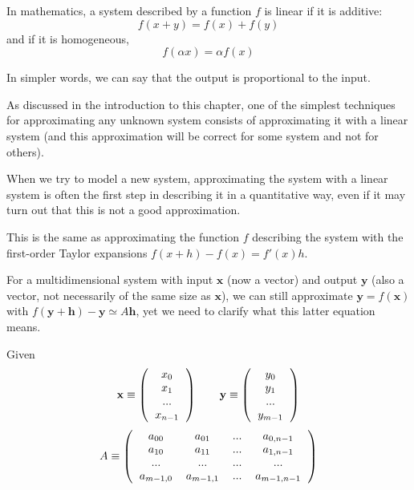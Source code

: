 \documentclass[justified, sixbynine]{tufte-book}
\theoremstyle{plain}%
\newtheorem * {corollary}{Corollary}
\theoremstyle{definition}
\theoremstyle{remark}
\newtheorem * {remark}{Remark}
\newtheorem * {note}{Note}
\begin{document}
\begin{fullwidth}
In mathematics, a system described by a function $f$ is linear if it is additive:
\begin{equation}
f(x+y) = f(x) + f(y)
\end{equation}
and if it is homogeneous, 
\begin{equation}
f(\alpha x) = \alpha f(x)
\end{equation}

In simpler words, we can say that the output is proportional to the input.

As discussed in the introduction to this chapter, one of the simplest techniques for approximating any unknown system consists of approximating it with a linear system (and this approximation will be correct for some system and not for others).

When we try to model a new system, approximating the system with a linear system is often the first step in describing it in a quantitative way, even if it may turn out that this is not a good approximation.

This is the same as approximating the function $f$ describing the system with the first-order Taylor expansions $f(x+h) - f(x) = f'(x) h$.

For a multidimensional system with input $\mathbf{x}$ (now a vector) and output $\mathbf{y}$ (also a vector, not necessarily of the same size as $\mathbf{x}$), we can still approximate $\mathbf{y}=f(\mathbf{x})$ with
$f(\mathbf{y}+\mathbf{h}) - \mathbf{y} \simeq A \mathbf{h}$, yet we need to clarify what this latter equation means.

Given
\begin{equation}
\mathbf{x} \equiv \left(\begin{tabular}{c}$x_0$\\$x_1$\\...\\$x_{n-1}$\end{tabular}\right)\qquad
\mathbf{y} \equiv \left(\begin{tabular}{c}$y_0$\\$y_1$\\...\\$y_{m-1}$\end{tabular}\right)
\end{equation}
\begin{equation}
A \equiv \left(\begin{tabular}{cccc}
$a_{00}$ & $a_{01}$ & ... & $a_{0, n-1}$ \\
$a_{10}$ & $a_{11}$ & ... & $a_{1, n-1}$ \\
... & ... & ... & ... \\
$a_{m-1, 0}$ & $a_{m-1, 1}$ & ... & $a_{m-1, n-1}$
\end{tabular}\right)
\end{equation}


\end{fullwidth}
\end{document}
